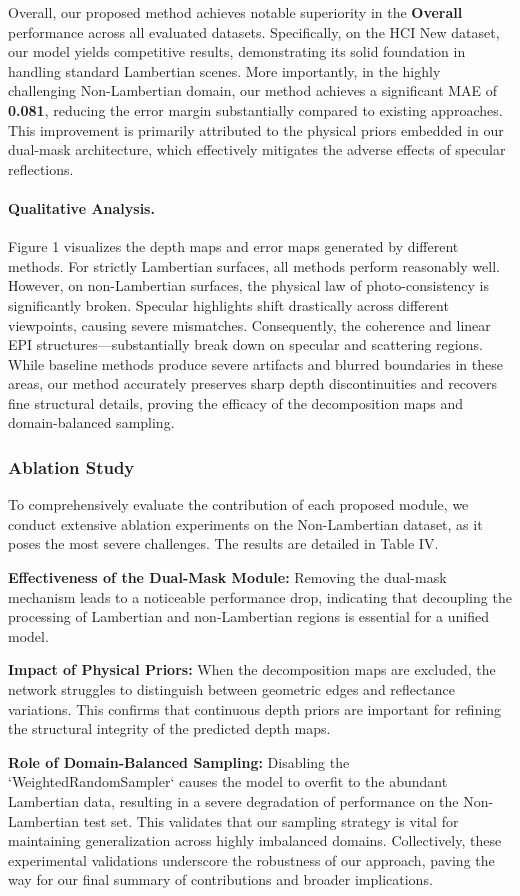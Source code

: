Overall, our proposed method achieves notable superiority in the \textbf{Overall} performance across all evaluated datasets. Specifically, on the HCI New dataset, our model yields competitive results, demonstrating its solid foundation in handling standard Lambertian scenes. More importantly, in the highly challenging Non-Lambertian domain, our method achieves a significant MAE of \textbf{0.081}, reducing the error margin substantially compared to existing approaches. This improvement is primarily attributed to the physical priors embedded in our dual-mask architecture, which effectively mitigates the adverse effects of specular reflections.

\paragraph{Qualitative Analysis.}
Figure 1 visualizes the depth maps and error maps generated by different methods. For strictly Lambertian surfaces, all methods perform reasonably well. However, on non-Lambertian surfaces, the physical law of photo-consistency is significantly broken. Specular highlights shift drastically across different viewpoints, causing severe mismatches. Consequently, the coherence and linear EPI structures—substantially break down on specular and scattering regions. While baseline methods produce severe artifacts and blurred boundaries in these areas, our method accurately preserves sharp depth discontinuities and recovers fine structural details, proving the efficacy of the decomposition maps and domain-balanced sampling.

\subsubsection{Ablation Study}

To comprehensively evaluate the contribution of each proposed module, we conduct extensive ablation experiments on the Non-Lambertian dataset, as it poses the most severe challenges. The results are detailed in Table IV.

\textbf{Effectiveness of the Dual-Mask Module:} 
Removing the dual-mask mechanism leads to a noticeable performance drop, indicating that decoupling the processing of Lambertian and non-Lambertian regions is essential for a unified model. 

\textbf{Impact of Physical Priors:} 
When the decomposition maps are excluded, the network struggles to distinguish between geometric edges and reflectance variations. This confirms that continuous depth priors are important for refining the structural integrity of the predicted depth maps.

\textbf{Role of Domain-Balanced Sampling:} 
Disabling the `WeightedRandomSampler` causes the model to overfit to the abundant Lambertian data, resulting in a severe degradation of performance on the Non-Lambertian test set. This validates that our sampling strategy is vital for maintaining generalization across highly imbalanced domains. Collectively, these experimental validations underscore the robustness of our approach, paving the way for our final summary of contributions and broader implications.